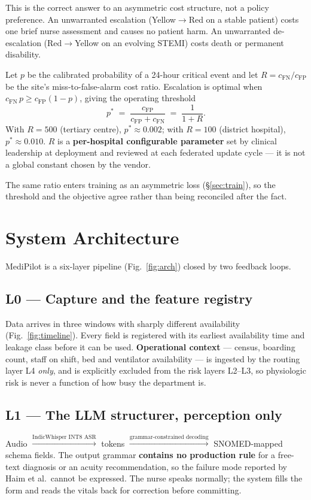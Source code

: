 \documentclass[10pt,a4paper,twocolumn]{article}
\begin{document}
\vspace{3pt}
This is the correct answer to an asymmetric cost structure, not a policy preference.
An unwarranted escalation (Yellow$\rightarrow$Red on a stable patient) costs one brief
nurse assessment and causes no patient harm. An unwarranted de-escalation
(Red$\rightarrow$Yellow on an evolving STEMI) costs death or permanent disability.

Let $p$ be the calibrated probability of a 24-hour critical event and let
$R = c_{\text{FN}}/c_{\text{FP}}$ be the site's miss-to-false-alarm cost ratio.
Escalation is optimal when $c_{\text{FN}}\,p \ge c_{\text{FP}}(1-p)$, giving the
operating threshold
\[
  p^{*} \;=\; \frac{c_{\text{FP}}}{c_{\text{FP}}+c_{\text{FN}}} \;=\; \frac{1}{1+R}.
\]
With $R=500$ (tertiary centre), $p^{*}\approx0.002$; with $R=100$ (district
hospital), $p^{*}\approx0.010$. $R$ is a \textbf{per-hospital configurable
parameter} set by clinical leadership at deployment and reviewed at each federated
update cycle --- it is not a global constant chosen by the vendor.

The same ratio enters training as an asymmetric loss (\S\ref{sec:train}), so the
threshold and the objective agree rather than being reconciled after the fact.

\section{System Architecture}
\label{sec:arch}

MediPilot is a six-layer pipeline (Fig.~\ref{fig:arch}) closed by two feedback loops.

\subsection{L0 --- Capture and the feature registry}
Data arrives in three windows with sharply different availability (Fig.~\ref{fig:timeline}).
Every field is registered with its earliest availability time and leakage class
before it can be used. \textbf{Operational context} --- census, boarding count, staff
on shift, bed and ventilator availability --- is ingested by the routing layer L4
\emph{only}, and is explicitly excluded from the risk layers L2--L3, so physiologic
risk is never a function of how busy the department is.

\subsection{L1 --- The LLM structurer, perception only}
Audio $\xrightarrow{\text{IndicWhisper INT8 ASR}}$ tokens
$\xrightarrow{\text{grammar-constrained decoding}}$ SNOMED-mapped schema fields.
The output grammar \textbf{contains no production rule} for a free-text diagnosis or
an acuity recommendation, so the failure mode reported by Haim et al.\ cannot be
expressed. The nurse speaks normally; the system fills the form and reads the vitals
back for correction before committing.
\end{document}
